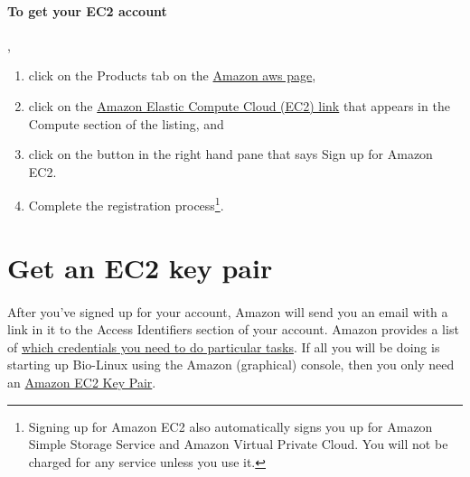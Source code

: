 \paragraph{To get your EC2 account}, 
\begin{enumerate}
\item click on the Products tab on the \href{http://aws.amazon.com}{Amazon aws page},
\item click on the \href{http://aws.amazon.com/ec2/}{Amazon Elastic Compute Cloud (EC2) link} that appears in the Compute section of the listing, and
\item click on the button in the right hand pane that says Sign up for Amazon EC2.  
\item Complete the registration process\footnote{Signing up for Amazon EC2 also automatically signs you up for Amazon Simple Storage Service and Amazon Virtual Private Cloud. You will not be charged for any service unless you use it.}.
\end{enumerate}

\section{Get an EC2 key pair}

\paragraph{}After you've signed up for your account, Amazon will send you an email with a link in it to the Access Identifiers section of your account. Amazon provides a list of \href{http://docs.amazonwebservices.com/AWSSecurityCredentials/1.0/AboutAWSCredentials.html#EC2Credentials}{which credentials you need to do particular tasks}.  If all you will be doing is starting up Bio-Linux using the Amazon (graphical) console, then you only need an \href{http://docs.amazonwebservices.com/AWSSecurityCredentials/1.0/AboutAWSCredentials.html#EC2KeyPairs}{Amazon EC2 Key Pair}. 

